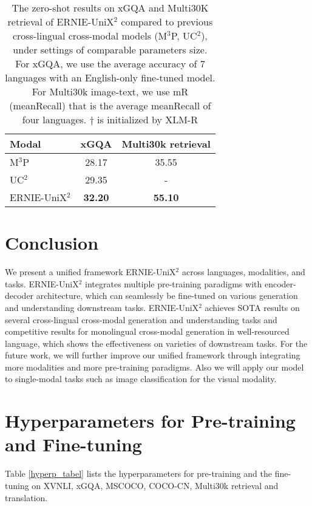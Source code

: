 \documentclass{article}
\begin{document}
\begin{table}[]
\centering

\centering


\begin{tabular}{@{}l|cc@{}}
\toprule
Modal & xGQA           & Multi30k retrieval \\ \midrule
M$^{3}$P   & 28.17          & 35.55              \\
UC$^{2}$   & 29.35          & -              \\
ERNIE-UniX$^{2}$ & \textbf{32.20} & \textbf{55.10}     \\ \bottomrule
\end{tabular}
\caption{The zero-shot results on xGQA and Multi30K retrieval  of ERNIE-UniX$^{2}$ compared to previous cross-lingual cross-modal models (M$^3$P, UC$^2$),  under settings of comparable parameters size. For xGQA, we use the average accuracy of 7 languages with an English-only fine-tuned model. For Multi30k image-text, we use mR (meanRecall) that is the average meanRecall of four languages. $\dagger$ is initialized by XLM-R} 

\label{tabel3}

\end{table}



\section{Conclusion}
We present a unified framework ERNIE-UniX$^2$  across languages, modalities, and tasks. ERNIE-UniX$^2$ integrates multiple pre-training paradigms with encoder-decoder architecture, which can seamlessly be fine-tuned on various generation and understanding downstream tasks. ERNIE-UniX$^2$  achieves SOTA results on several cross-lingual cross-modal generation and understanding tasks and competitive results for monolingual cross-modal generation in well-resourced language, which shows the effectiveness on varieties of downstream tasks. 
For the future work, we will further improve our unified framework through integrating more modalities and more pre-training paradigms. Also we will apply our model to single-modal tasks such as image classification for the visual modality. 
  
  

\clearpage

\appendix


\section{Hyperparameters for Pre-training and Fine-tuning}
Table \ref{hyperp_tabel} lists the hyperparameters for pre-training and the fine-tuning on XVNLI, xGQA, MSCOCO, COCO-CN, Multi30k retrieval and translation. 
\end{document}
